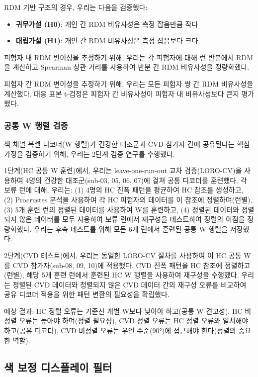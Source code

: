 \documentclass[12pt,a4paper]{article}
\begin{document}
RDM 기반 구조의 경우, 우리는 다음을 검증했다:
\begin{itemize}
\item \textbf{귀무가설 (H0)}: 개인 간 RDM 비유사성은 측정 잡음만큼 작다
\item \textbf{대립가설 (H1)}: 개인 간 RDM 비유사성은 측정 잡음보다 크다
\end{itemize}

피험자 내 RDM 변이성을 추정하기 위해, 우리는 각 피험자에 대해 런 반분에서 RDM을 계산하고 Spearman 상관 거리를 사용하여 반분 간 RDM 비유사성을 정량화했다.

피험자 간 RDM 변이성을 추정하기 위해, 우리는 모든 피험자 쌍 간 RDM 비유사성을 계산했다. 대응 표본 t-검정은 피험자 간 비유사성이 피험자 내 비유사성보다 큰지 평가했다.

\subsubsection{공통 W 행렬 검증}

색 채널-복셀 디코더(W 행렬)가 건강한 대조군과 CVD 참가자 간에 공유된다는 핵심 가정을 검증하기 위해, 우리는 2단계 검증 연구를 수행했다.

1단계(HC 공통 W 훈련)에서, 우리는 leave-one-run-out 교차 검증(LORO-CV)을 사용하여 4명의 건강한 대조군(sub-03, 05, 06, 07)에 걸쳐 공통 디코더를 훈련했다. 각 보류 런에 대해, 우리는: (1) 4명의 HC 진폭 패턴을 평균하여 HC 참조를 생성하고, (2) Procrustes 분석을 사용하여 각 HC 피험자의 데이터를 이 참조에 정렬하며(런별), (3) 5개 훈련 런의 정렬된 데이터를 사용하여 W를 훈련하고, (4) 정렬된 데이터와 정렬되지 않은 데이터를 모두 사용하여 보류 런에서 재구성을 테스트하여 정렬의 이점을 정량화했다. 우리는 후속 테스트를 위해 모든 6개 런에서 훈련된 공통 W 행렬을 저장했다.

2단계(CVD 테스트)에서, 우리는 동일한 LORO-CV 절차를 사용하여 이 HC 공통 W를 CVD 참가자(sub-08, 09, 10)에 적용했다. CVD 진폭 패턴을 HC 참조에 정렬하고(런별), 해당 5개 훈련 런에서 훈련된 HC W 행렬을 사용하여 재구성을 수행했다. 우리는 정렬된 CVD 데이터와 정렬되지 않은 CVD 데이터 간의 재구성 오류를 비교하여 공유 디코더 적용을 위한 패턴 변환의 필요성을 확립했다.

예상 결과: HC 정렬 오류는 기준선 개별 W보다 낮아야 하고(공통 W 견고성), HC 비정렬 오류는 높아야 하며(정렬 필요성), CVD 정렬 오류는 HC 정렬 오류와 일치해야 하고(공유 디코더), CVD 비정렬 오류는 우연 수준(90°)에 접근해야 한다(정렬의 중요한 역할).

\subsection{색 보정 디스플레이 필터}
\end{document}
